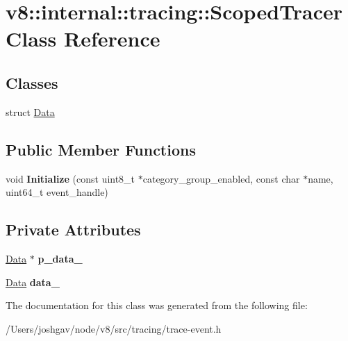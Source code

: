 \hypertarget{classv8_1_1internal_1_1tracing_1_1_scoped_tracer}{}\section{v8\+:\+:internal\+:\+:tracing\+:\+:Scoped\+Tracer Class Reference}
\label{classv8_1_1internal_1_1tracing_1_1_scoped_tracer}
\subsection*{Classes}
\begin{DoxyCompactItemize}
\item 
struct \hyperlink{structv8_1_1internal_1_1tracing_1_1_scoped_tracer_1_1_data}{Data}
\end{DoxyCompactItemize}
\subsection*{Public Member Functions}
\begin{DoxyCompactItemize}
\item 
void {\bfseries Initialize} (const uint8\+\_\+t $\ast$category\+\_\+group\+\_\+enabled, const char $\ast$name, uint64\+\_\+t event\+\_\+handle)\hypertarget{classv8_1_1internal_1_1tracing_1_1_scoped_tracer_a1fccb9a2117059aab777076c73b3c6cb}{}\label{classv8_1_1internal_1_1tracing_1_1_scoped_tracer_a1fccb9a2117059aab777076c73b3c6cb}

\end{DoxyCompactItemize}
\subsection*{Private Attributes}
\begin{DoxyCompactItemize}
\item 
\hyperlink{structv8_1_1internal_1_1tracing_1_1_scoped_tracer_1_1_data}{Data} $\ast$ {\bfseries p\+\_\+data\+\_\+}\hypertarget{classv8_1_1internal_1_1tracing_1_1_scoped_tracer_afb2492e2180589527c018e5ab7ca7947}{}\label{classv8_1_1internal_1_1tracing_1_1_scoped_tracer_afb2492e2180589527c018e5ab7ca7947}

\item 
\hyperlink{structv8_1_1internal_1_1tracing_1_1_scoped_tracer_1_1_data}{Data} {\bfseries data\+\_\+}\hypertarget{classv8_1_1internal_1_1tracing_1_1_scoped_tracer_a0e04985a44af0422e30fa70a3ff2d008}{}\label{classv8_1_1internal_1_1tracing_1_1_scoped_tracer_a0e04985a44af0422e30fa70a3ff2d008}

\end{DoxyCompactItemize}


The documentation for this class was generated from the following file\+:\begin{DoxyCompactItemize}
\item 
/\+Users/joshgav/node/v8/src/tracing/trace-\/event.\+h\end{DoxyCompactItemize}
